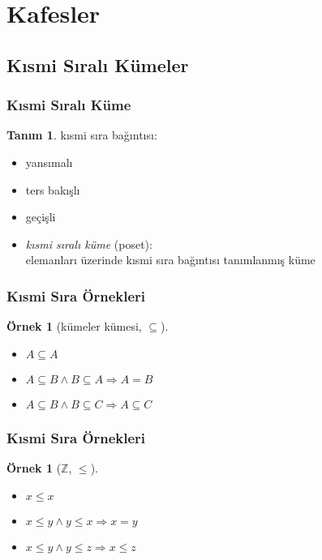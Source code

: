 \documentclass[dvipsnames]{beamer}
\theoremstyle{definition}
\newtheorem{tanim}[theorem]{Tanım}
\theoremstyle{example}
\newtheorem{ornek}[theorem]{Örnek}
\theoremstyle{plain}
\begin{document}
\section{Kafesler}

\subsection{Kısmi Sıralı Kümeler}

\begin{frame}
  \frametitle{Kısmi Sıralı Küme}

  \begin{tanim}
    \alert{kısmi sıra bağıntısı}:
    \begin{itemize}
      \item yansımalı
      \item ters bakışlı
      \item geçişli
    \end{itemize}
  \end{tanim}

  \pause
  \begin{itemize}
    \item \emph{kısmi sıralı küme} (\alert{poset}):\\
      elemanları üzerinde kısmi sıra bağıntısı tanımlanmış küme
  \end{itemize}
\end{frame}

\begin{frame}
  \frametitle{Kısmi Sıra Örnekleri}

  \begin{ornek}[kümeler kümesi, $\subseteq$]
    \begin{itemize}
      \item $A \subseteq A$
      \item $A \subseteq B \wedge B \subseteq A \Rightarrow A = B$
      \item $A \subseteq B \wedge B \subseteq C \Rightarrow A \subseteq C$
    \end{itemize}
  \end{ornek}
\end{frame}

\begin{frame}
  \frametitle{Kısmi Sıra Örnekleri}

  \begin{ornek}[$\mathbb{Z}$, $\leq$]
    \begin{itemize}
      \item $x \leq x$
      \item $x \leq y \wedge y \leq x \Rightarrow x = y$
      \item $x \leq y \wedge y \leq z \Rightarrow x \leq z$
    \end{itemize}
  \end{ornek}
\end{frame}
\end{document}
